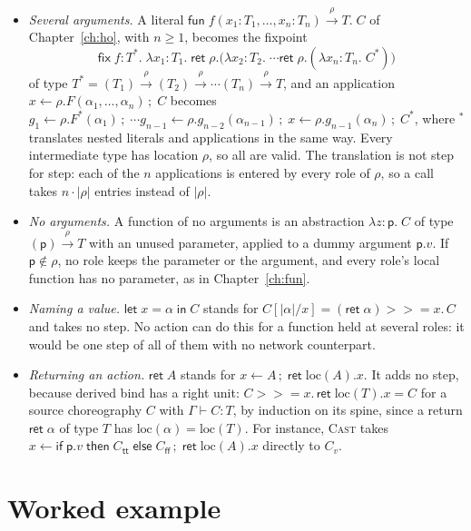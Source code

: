 \documentclass[11pt]{report}
\theoremstyle{plain}
\theoremstyle{definition}
\theoremstyle{remark}
\newcommand{\kw}[1]{\mathsf{#1}}
\newcommand{\pp}{\mathsf{p}}
\newcommand{\ttrue}{\kw{tt}}
\newcommand{\ffalse}{\kw{ff}}
\newcommand{\bind}[3]{#1 \leftarrow #2\,;\;#3}
\newcommand{\cret}[1]{\kw{ret}\;#1}
\newcommand{\cif}[4]{\kw{if}\;#1.#2\;\kw{then}\;#3\;\kw{else}\;#4}
\newcommand{\mbind}[3]{#1 \mathbin{>\!\!>\!\!=} #2.\,#3}
\newcommand{\loc}[1]{\mathrm{loc}(#1)}
\newcommand{\pay}[1]{\lvert #1\rvert}
\newcommand{\farr}[3]{(#1) \xrightarrow{#2} #3}
\newcommand{\cfun}[5]{\kw{fun}\;#1(#2) \xrightarrow{#3} #4.\;#5}
\newcommand{\clam}[3]{\lambda #1{:}#2.\;#3}
\newcommand{\cfix}[3]{\kw{fix}\;#1{:}#2.\;#3}
\newcommand{\rn}[1]{{\normalfont\scshape #1}}
\begin{document}
\begin{itemize}
\item \emph{Several arguments.}  A literal
  $\cfun{f}{x_1{:}T_1,\ldots,x_n{:}T_n}{\rho}{T}{C}$ of
  Chapter~\ref{ch:ho}, with $n\ge 1$, becomes the fixpoint
  \[
    \cfix{f}{T^\ast}{\clam{x_1}{T_1}{\cret{\rho.\big(\clam{x_2}{T_2}{\cdots\cret{\rho.(\clam{x_n}{T_n}{C^\ast})}}\big)}}}
  \]
  of type
  $T^\ast=\farr{T_1}{\rho}{\farr{T_2}{\rho}{\cdots\farr{T_n}{\rho}{T}}}$,
  and an application $\bind{x}{\rho.F(\alpha_1,\ldots,\alpha_n)}{C}$
  becomes
  $\bind{g_1}{\rho.F^\ast(\alpha_1)}{\cdots\bind{g_{n-1}}{\rho.g_{n-2}(\alpha_{n-1})}{\bind{x}{\rho.g_{n-1}(\alpha_n)}{C^\ast}}}$,
  where ${}^\ast$ translates nested literals and applications in the same
  way.  Every intermediate type has location $\rho$, so all are valid.
  The translation is not step for step: each of the $n$ applications is
  entered by every role of $\rho$, so a call takes $n\cdot|\rho|$ entries
  instead of $|\rho|$.
\item \emph{No arguments.}  A function of no arguments is an abstraction
  $\clam{z}{\pp}{C}$ of type $\farr{\pp}{\rho}{T}$ with an unused parameter,
  applied to a dummy argument $\pp.v$.  If $\pp\notin\rho$, no role keeps
  the parameter or the argument,
  and every role's local function has no parameter, as in
  Chapter~\ref{ch:fun}.
\item \emph{Naming a value.}  $\kw{let}\;x=\alpha\;\kw{in}\;C$ stands for
  $C[\pay{\alpha}/x]=\mbind{(\cret{\alpha})}{x}{C}$ and takes no step.  No
  action can do this for a function held at several roles: it would be one
  step of all of them with no network counterpart.
\item \emph{Returning an action.}  $\cret{A}$ stands for
  $\bind{x}{A}{\cret{\loc{A}.x}}$.  It adds no step, because derived bind
  has a right unit: $\mbind{C}{x}{\cret{\loc{T}.x}}=C$ for a source
  choreography $C$ with $\Gamma\vdash C:T$, by induction on its spine, since
  a return $\cret{\alpha}$ of type $T$ has $\loc{\alpha}=\loc{T}$.  For
  instance, \rn{Cast} takes
  $\bind{x}{\cif{\pp}{v}{C_\ttrue}{C_\ffalse}}{\cret{\loc{A}.x}}$ directly
  to $C_v$.
\end{itemize}

\section{Worked example}
\label{sec:c5-example}
\end{document}
